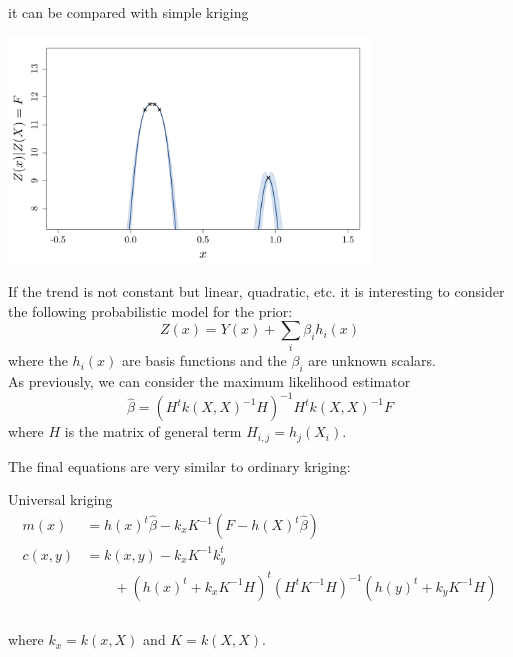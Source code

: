 \documentclass{beamer}
\begin{document}
\begin{frame}{}
it can be compared with simple kriging
\begin{center}
	\includegraphics[height=6cm]{figures/R/trend_badks}
\end{center}
\end{frame}

\begin{frame}{}
If the trend is not constant but linear, quadratic, etc. it is interesting to consider the following probabilistic model for the prior:
\begin{equation*}
	Z(x) = Y(x) + \sum_i \beta_i h_i(x)
\end{equation*}
where the $h_i(x)$ are basis functions and the $\beta_i$ are unknown scalars.\\ \vspace{5mm}
As previously, we can consider the maximum likelihood estimator 
\begin{equation*}
 \hat{\beta} = (H^t k(X,X)^{-1} H)^{-1} H^t k(X,X)^{-1} F 
\end{equation*} 
where $H$ is the matrix of general term $H_{i,j}=h_j(X_i)$.
\end{frame}

\begin{frame}{}
The final equations are very similar to ordinary kriging:
\begin{block}{Universal kriging}
\begin{equation*}
\begin{split}
m(x) &= h(x)^t\hat{\beta} - k_x K^{-1} (F - h(X)^t\hat{\beta}) \\
c(x,y) &=  k(x,y) - k_x K^{-1} k_y^t \\
& \qquad +(h(x)^t + k_xK^{-1}H)^t(H^t K^{-1} H)^{-1}(h(y)^t + k_yK^{-1}H) \\
\end{split}
\end{equation*} 
\\ \vspace{3mm}
where $k_x = k(x,X)$ and $K = k(X,X)$.
\end{block}
\end{frame}
\end{document}

